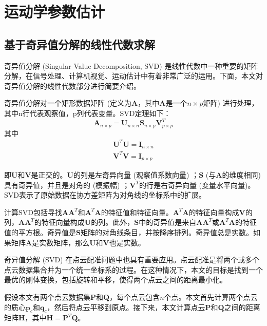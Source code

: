 \section{运动学参数估计}
\subsection{基于奇异值分解的线性代数求解}
奇异值分解\cite{levinson2020analysis} (Singular Value Decomposition, SVD) 是线性代数中一种重要的矩阵分解，在信号处理、计算机视觉、运动估计中有着非常广泛的运用。下面，本文对奇异值分解的线性代数部分进行简要介绍。

奇异值分解对一个矩形数据矩阵 (定义为$\boldsymbol{A}$，其中$\boldsymbol{A}$是一个$n \times p$矩阵) 进行处理，其中n行代表观察值，p列代表变量。SVD定理如下：
\begin{equation}
\boldsymbol{A}_{n \times p} = \boldsymbol{U}_{n \times n} \boldsymbol{S}_{n \times p} \boldsymbol{V}^T_{p \times p}
\end{equation}
其中
\begin{align}
    \boldsymbol{U}^T \boldsymbol{U} = \boldsymbol{I}_{n \times n} \\
    \boldsymbol{V}^T \boldsymbol{V} = \boldsymbol{I}_{p \times p}
\end{align}

即$\boldsymbol{U}$和$\boldsymbol{V}$是正交的。$\boldsymbol{U}$的列是左奇异向量 (观察值系数向量) ；$\boldsymbol{S}$ (与$\boldsymbol{A}$的维度相同) 具有奇异值，并且是对角的 (模振幅) ；$\boldsymbol{V}^T$的行是右奇异向量 (变量水平向量)。SVD表示了原始数据在协方差矩阵为对角线的坐标系中的扩展。

计算SVD包括寻找$\boldsymbol{A} \boldsymbol{A}^T$和$\boldsymbol{A}^T \boldsymbol{A}$的特征值和特征向量。$\boldsymbol{A}^T \boldsymbol{A}$的特征向量构成$\boldsymbol{V}$的列，$\boldsymbol{A} \boldsymbol{A}^T$的特征向量构成$\boldsymbol{U}$的列。此外，$\boldsymbol{S}$中的奇异值是来自$\boldsymbol{A} \boldsymbol{A}^T$或$\boldsymbol{A}^T \boldsymbol{A}$的特征值的平方根。奇异值是$\boldsymbol{S}$矩阵的对角线条目，并按降序排列。奇异值总是实数。如果矩阵$\boldsymbol{A}$是实数矩阵，那么$\boldsymbol{U}$和$\boldsymbol{V}$也是实数。

奇异值分解 (SVD) 在点云配准问题中也具有重要应用。点云配准是将两个或多个点云数据集合并为一个统一坐标系的过程。在这种情况下，本文的目标是找到一个最优的刚体变换，包括旋转和平移，使得两个点云之间的距离最小化。

假设本文有两个点云数据集$\boldsymbol{P}$和$\boldsymbol{Q}$，每个点云包含$n$个点。本文首先计算两个点云的质心$\boldsymbol{p}_c$和$\boldsymbol{q}_c$，然后将点云平移到原点。接下来，本文计算点云$\boldsymbol{P}$和$\boldsymbol{Q}$之间的距离矩阵$\boldsymbol{H}$，其中$\boldsymbol{H}=\boldsymbol{P}^T\boldsymbol{Q}$。

